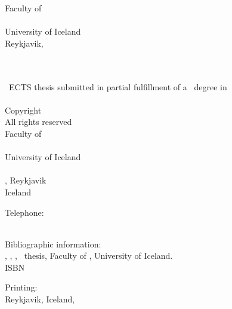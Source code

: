 \documentclass[
]{book}
\begin{document}
\begin{titlepage}
\begin{center}
\vfill
Faculty of \thesisfaculty \\
\thesisschool \\
University of Iceland \\
Reykjavik, \thesismonth~\thesisyear
\newpage
\end{center}
 \newpage
 \thispagestyle{empty}
 \mbox{} \vfill
 \sffamily{\thesistitle} \\
 \sffamily{\thesisshorttitle} \\
 \thesiscredits ~ECTS thesis submitted in partial fulfillment of a \thesiskind~degree in \thesissubject
\\ \\
Copyright \textcopyright~\thesisyear~ \thesisauthor \\
All rights reserved \\


Faculty of \thesisfaculty \\
\thesisschool \\
University of Iceland \\
\thesisaddress \\
\thesispostalcode, Reykjavik \\
Iceland

Telephone: \thesistelephone \\ \\
\vspace*{\lineskip}

Bibliographic information: \\
\thesisauthor, \thesisyear, \thesistitle, \thesiskind~thesis, Faculty of \thesisfaculty, University of Iceland. \\

ISBN~\thesisISBN

Printing: \thesisPrinting \\
Reykjavik, Iceland, \thesismonth~\thesisyear \\
\newpage
\thispagestyle{empty} \mbox{}
\vfill
\begin{center}\textit{\thesisdedication}\end{center} \vspace*{5cm}
\vfill 

\thispagestyle{empty}
\cleardoublepage
\end{titlepage}


\end{document}
